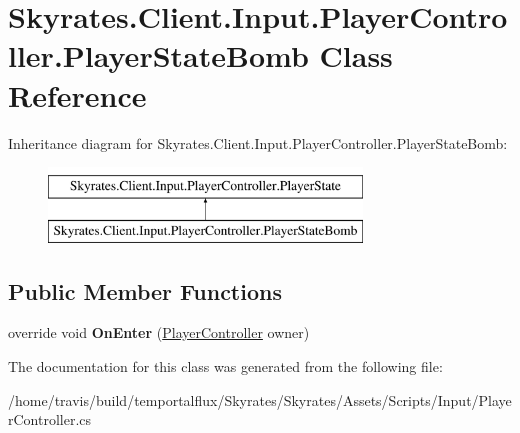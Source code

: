 \hypertarget{class_skyrates_1_1_client_1_1_input_1_1_player_controller_1_1_player_state_bomb}{\section{Skyrates.\-Client.\-Input.\-Player\-Controller.\-Player\-State\-Bomb Class Reference}
\label{class_skyrates_1_1_client_1_1_input_1_1_player_controller_1_1_player_state_bomb}
}
Inheritance diagram for Skyrates.\-Client.\-Input.\-Player\-Controller.\-Player\-State\-Bomb\-:\begin{figure}[H]
\begin{center}
\leavevmode
\includegraphics[height=2.000000cm]{class_skyrates_1_1_client_1_1_input_1_1_player_controller_1_1_player_state_bomb}
\end{center}
\end{figure}
\subsection*{Public Member Functions}
\begin{DoxyCompactItemize}
\item 
\hypertarget{class_skyrates_1_1_client_1_1_input_1_1_player_controller_1_1_player_state_bomb_a0560715dba94ee967ac48670f33f3c8f}{override void {\bfseries On\-Enter} (\hyperlink{class_skyrates_1_1_client_1_1_input_1_1_player_controller}{Player\-Controller} owner)}\label{class_skyrates_1_1_client_1_1_input_1_1_player_controller_1_1_player_state_bomb_a0560715dba94ee967ac48670f33f3c8f}

\end{DoxyCompactItemize}


The documentation for this class was generated from the following file\-:\begin{DoxyCompactItemize}
\item 
/home/travis/build/temportalflux/\-Skyrates/\-Skyrates/\-Assets/\-Scripts/\-Input/Player\-Controller.\-cs\end{DoxyCompactItemize}
